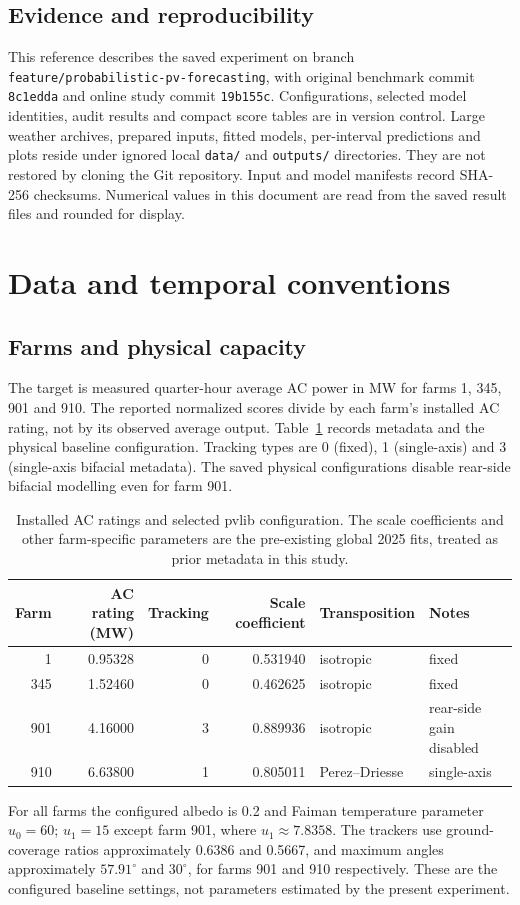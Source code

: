\documentclass[11pt,a4paper]{article}
\newcommand{\code}[1]{\nolinkurl{#1}}
\begin{document}
\subsection{Evidence and reproducibility}
This reference describes the saved experiment on branch \code{feature/probabilistic-pv-forecasting}, with original benchmark commit \code{8c1edda} and online study commit \code{19b155c}. Configurations, selected model identities, audit results and compact score tables are in version control. Large weather archives, prepared inputs, fitted models, per-interval predictions and plots reside under ignored local \code{data/} and \code{outputs/} directories. They are not restored by cloning the Git repository. Input and model manifests record SHA-256 checksums. Numerical values in this document are read from the saved result files and rounded for display.

\section{Data and temporal conventions}
\subsection{Farms and physical capacity}
The target is measured quarter-hour average AC power in MW for farms 1, 345, 901 and 910. The reported normalized scores divide by each farm's installed AC rating, not by its observed average output. Table~\ref{tab:farms} records metadata and the physical baseline configuration. Tracking types are 0 (fixed), 1 (single-axis) and 3 (single-axis bifacial metadata). The saved physical configurations disable rear-side bifacial modelling even for farm 901.
\begin{table}[H]\centering\small
\begin{tabular}{rrrrll}
\toprule
Farm & AC rating (MW) & Tracking & Scale coefficient & Transposition & Notes\\
\midrule
1 & 0.95328 & 0 & 0.531940 & isotropic & fixed\\
345 & 1.52460 & 0 & 0.462625 & isotropic & fixed\\
901 & 4.16000 & 3 & 0.889936 & isotropic & rear-side gain disabled\\
910 & 6.63800 & 1 & 0.805011 & Perez--Driesse & single-axis\\
\bottomrule
\end{tabular}\caption{Installed AC ratings and selected pvlib configuration. The scale coefficients and other farm-specific parameters are the pre-existing global 2025 fits, treated as prior metadata in this study.}\label{tab:farms}\end{table}
For all farms the configured albedo is 0.2 and Faiman temperature parameter $u_0=60$; $u_1=15$ except farm 901, where $u_1\approx7.8358$. The trackers use ground-coverage ratios approximately 0.6386 and 0.5667, and maximum angles approximately $57.91^{\circ}$ and $30^{\circ}$, for farms 901 and 910 respectively. These are the configured baseline settings, not parameters estimated by the present experiment.
\end{document}

